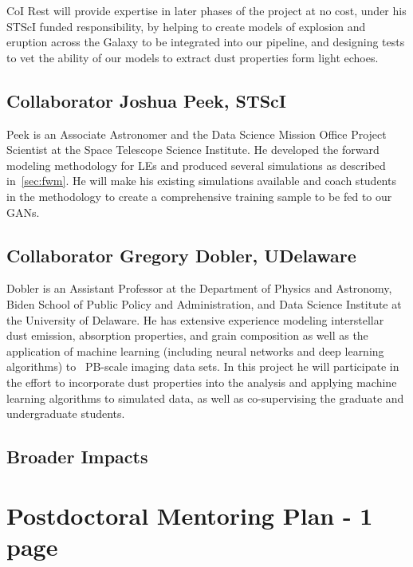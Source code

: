 \documentclass{proposalnsf}
\begin{document}
CoI Rest will provide expertise in later phases of the project at no cost, under his STScI funded responsibility, by helping to create models of explosion and eruption across the Galaxy to be integrated into our pipeline, and designing tests to vet the ability of our models to extract dust properties form light echoes.





\subsection{Collaborator Joshua Peek, STScI}
Peek is an Associate Astronomer and the Data Science Mission Office Project Scientist at the Space Telescope Science Institute.  He developed the forward modeling methodology for LEs and produced several simulations as described in~\autoref{sec:fwm}.  He will make his existing simulations available and coach students in the methodology to create a comprehensive training sample to be fed to our GANs.  

\subsection{Collaborator Gregory Dobler, UDelaware}
Dobler is an Assistant Professor at the Department of Physics and Astronomy, Biden School of Public Policy and Administration, and Data Science Institute at the University of Delaware.   He has extensive experience modeling interstellar dust emission, absorption properties, and grain composition as well as the application of machine learning (including neural networks and deep learning algorithms) to ~PB-scale imaging data sets.   In this project he will participate in the effort to incorporate dust properties into the analysis and applying machine learning algorithms to simulated data, as well as co-supervising the graduate and undergraduate students.

\subsection{Broader Impacts}


\clearpage
{}
\clearpage
\section{Postdoctoral Mentoring Plan - 1 page}



\clearpage


\newpage
{}
\renewcommand{\thepage} {E--\arabic{page}}




\newpage
{}
\renewcommand{\thepage} {G--\arabic{page}}
\end{document}
